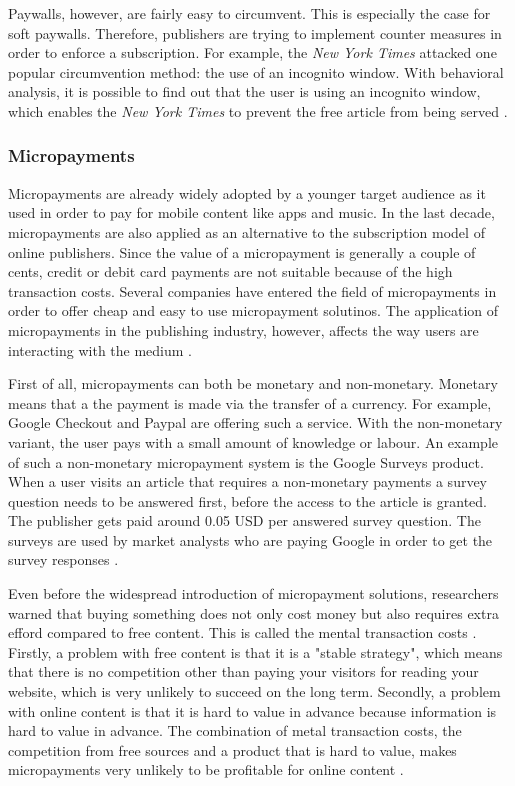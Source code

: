 
Paywalls, however, are fairly easy to circumvent. This is especially the case for soft paywalls. Therefore, publishers are trying to implement counter measures in order to enforce a subscription. For example, the \textit{New York Times} attacked one popular circumvention method: the use of an incognito window. With behavioral analysis, it is possible to find out that the user is using an incognito window, which enables the \textit{New York Times} to prevent the free article from being served \cite{troupson2015yes}.  

\subsubsection{Micropayments}
Micropayments are already widely adopted by a younger target audience as it used in order to pay for mobile content like apps and music. In the last decade, micropayments are also applied as an alternative to the subscription model of online publishers. Since the value of a micropayment is generally a couple of cents, credit or debit card payments are not suitable because of the high transaction costs. Several companies have entered the field of micropayments in order to offer cheap and easy to use micropayment solutinos. The application of micropayments in the publishing industry, however, affects the way users are interacting with the medium \cite{geidner2015effects}. 

First of all, micropayments can both be monetary and non-monetary. Monetary means that a the payment is made via the transfer of a currency. For example, Google Checkout and Paypal are offering such a service. With the non-monetary variant, the user pays with a small amount of knowledge or labour. An example of such a non-monetary micropayment system is the Google Surveys product. When a user visits an article that requires a non-monetary payments a survey question needs to be answered first, before the access to the article is granted. The publisher gets paid around 0.05 USD per answered survey question. The surveys are used by market analysts who are paying Google in order to get the survey responses \cite{googlesurveys}.

Even before the widespread introduction of micropayment solutions, researchers warned that buying something does not only cost money but also requires extra efford compared to free content. This is called the mental transaction costs \cite{szabo, shirky}. Firstly, a problem with free content is that it is a "stable strategy", which means that there is no competition other than paying your visitors for reading your website, which is very unlikely to succeed on the long term. Secondly, a problem with online content is that it is hard to value in advance because information is hard to value in advance. The combination of metal transaction costs, the competition from free sources and a product that is hard to value, makes micropayments very unlikely to be profitable for online content \cite{shirky}.

